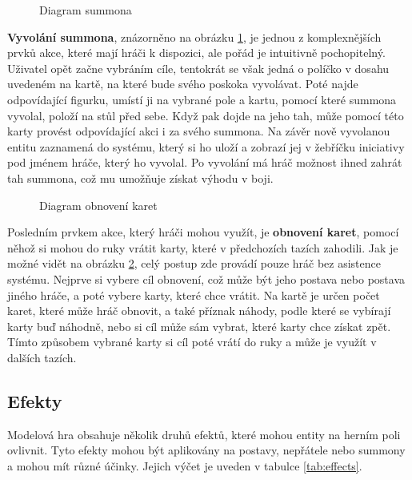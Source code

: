 \begin{figure}[h]
    \centering
    \caption{Diagram summona}
    \label{diag:summon}
\end{figure}

\textbf{Vyvolání summona}, znázorněno na obrázku \ref{diag:summon}, je jednou z komplexnějších prvků akce, které mají hráči k dispozici, ale pořád je intuitivně pochopitelný. Uživatel opět začne vybráním cíle, tentokrát se však jedná o políčko v dosahu uvedeném na kartě, na které bude svého poskoka vyvolávat. Poté najde odpovídající figurku, umístí ji na vybrané pole a kartu, pomocí které summona vyvolal, položí na stůl před sebe. Když pak dojde na jeho tah, může pomocí této karty provést odpovídající akci i za svého summona. Na závěr nově vyvolanou entitu zaznamená do systému, který si ho uloží a zobrazí jej v žebříčku iniciativy pod jménem hráče, který ho vyvolal. Po vyvolání má hráč možnost ihned zahrát tah summona, což mu umožňuje získat výhodu v boji.

\begin{figure}[h]
    \centering
    \caption{Diagram obnovení karet}
    \label{diag:restore_cards}
\end{figure}

Posledním prvkem akce, který hráči mohou využít, je \textbf{obnovení karet}, pomocí něhož si mohou do ruky vrátit karty, které v předchozích tazích zahodili. Jak je možné vidět na obrázku \ref{diag:restore_cards}, celý postup zde provádí pouze hráč bez asistence systému. Nejprve si vybere cíl obnovení, což může být jeho postava nebo postava jiného hráče, a poté vybere karty, které chce vrátit. Na kartě je určen počet karet, které může hráč obnovit, a také příznak náhody, podle které se vybírají karty buď náhodně, nebo si cíl může sám vybrat, které karty chce získat zpět. Tímto způsobem vybrané karty si cíl poté vrátí do ruky a může je využít v dalších tazích.



\subsection{Efekty}
\label{subsec:design_effects}

Modelová hra obsahuje několik druhů efektů, které mohou entity na herním poli ovlivnit. Tyto efekty mohou být aplikovány na postavy, nepřátele nebo summony a mohou mít různé účinky. Jejich výčet je uveden v tabulce \ref{tab:effects}.

